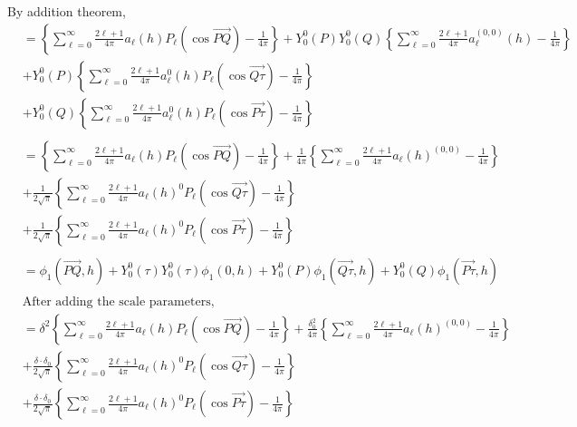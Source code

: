 \documentclass[11pt]{article}
\begin{document}
\begin{itemize}
By addition theorem,\\
\begin{align*}
&= \left\{ \sum_{\ell=0}^\infty \frac{2\ell+1}{4\pi} a_\ell(h) P_\ell(\cos{\overrightarrow{PQ}}) - \frac{1}{4\pi} \right\} + Y_0^0(P)Y_0^0(Q) \left\{ \sum_{\ell=0}^{\infty}  \frac{2\ell+1}{4\pi} a_{\ell}^{(0,0)}(h) - \frac{1}{4\pi} \right\}\\
&+ Y_0^0(P) \left\{ \sum_{\ell=0}^{\infty}  \frac{2\ell+1}{4\pi} a_{\ell}^{0}(h)  P_\ell(\cos{\overrightarrow{Q\tau}}) - \frac{1}{4\pi} \right\}\\ 
&+ Y_0^0(Q) \left\{ \sum_{\ell=0}^{\infty}  \frac{2\ell+1}{4\pi} a_{\ell}^{0}(h)  P_\ell(\cos{\overrightarrow{P \tau}}) - \frac{1}{4\pi} \right\}\\
\\
&= \left\{ \sum_{\ell=0}^\infty \frac{2\ell+1}{4\pi} a_\ell(h) P_\ell(\cos{\overrightarrow{PQ}}) - \frac{1}{4\pi} \right\} + \frac{1}{4\pi} \left\{ \sum_{\ell=0}^{\infty}  \frac{2\ell+1}{4\pi} a_{\ell}(h)^{(0,0)} - \frac{1}{4\pi} \right\}\\
&+ \frac{1}{2\sqrt{\pi}} \left\{ \sum_{\ell=0}^{\infty}  \frac{2\ell+1}{4\pi} a_{\ell}(h)^0  P_\ell(\cos{\overrightarrow{Q\tau}}) - \frac{1}{4\pi} \right\}\\ 
&+ \frac{1}{2\sqrt{\pi}} \left\{ \sum_{\ell=0}^{\infty}  \frac{2\ell+1}{4\pi} a_{\ell}(h)^0  P_\ell(\cos{\overrightarrow{P \tau}}) - \frac{1}{4\pi} \right\}\\
\\
&= \phi_1(\overrightarrow{PQ},h) + Y_0^0(\tau) Y_0^0(\tau) \phi_1(0,h) +  Y_0^0(P) \phi_1(\overrightarrow{Q\tau},h)  + Y_0^0(Q) \phi_1(\overrightarrow{P\tau},h)\\
\\
&\text{After adding the scale parameters, }\\
&= \delta^2 \left\{ \sum_{\ell=0}^\infty \frac{2\ell+1}{4\pi} a_\ell(h) P_\ell(\cos{\overrightarrow{PQ}}) - \frac{1}{4\pi} \right\} + \frac{\delta_0^2}{4\pi} \left\{ \sum_{\ell=0}^{\infty}  \frac{2\ell+1}{4\pi} a_{\ell}(h)^{(0,0)} - \frac{1}{4\pi} \right\}\\
&+ \frac{\delta \cdot \delta_0}{2\sqrt{\pi}} \left\{ \sum_{\ell=0}^{\infty}  \frac{2\ell+1}{4\pi} a_{\ell}(h)^0  P_\ell(\cos{\overrightarrow{Q\tau}}) - \frac{1}{4\pi} \right\}\\ 
&+ \frac{\delta \cdot \delta_0}{2\sqrt{\pi}} \left\{ \sum_{\ell=0}^{\infty}  \frac{2\ell+1}{4\pi} a_{\ell}(h)^0  P_\ell(\cos{\overrightarrow{P \tau}}) - \frac{1}{4\pi} \right\}\\

\end{align*}
\end{itemize}
\end{document}
